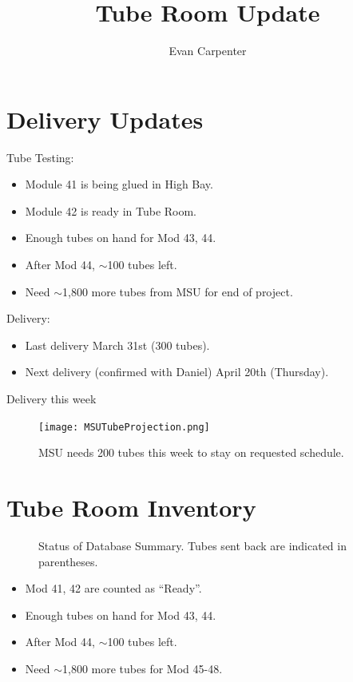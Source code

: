 \documentclass{beamer}
\title{Tube Room Update}
\author{Evan Carpenter}
\begin{document}
\begin{frame}
	\titlepage
\end{frame}
\section{Delivery Updates}
	\begin{frame}
		\begin{block}{Tube Testing:}
			\begin{itemize}
				\item Module 41 is being glued in High Bay.
				\item Module 42 is ready in Tube Room.
				\item Enough tubes on hand for Mod 43, 44.
				\item After Mod 44, $\sim$100 tubes left. 
				\item Need $\sim$1,800 more tubes from MSU for end of project.
			\end{itemize}
		\end{block}
		\begin{block}{Delivery:}
			\begin{itemize}
				\item Last delivery March 31st (300 tubes). 
				\item Next delivery (confirmed with Daniel) April 20th (Thursday).
			\end{itemize}
		\end{block}
	\end{frame}
\begin{frame}{Delivery this week}
	\begin{figure}[H]
		\texttt{[image: MSUTubeProjection.png]}
		\caption{MSU needs 200 tubes this week to stay on requested schedule.}
	\end{figure}
	
\end{frame}
\section{Tube Room Inventory}	
		
		\begin{frame}
			\begin{figure}
				\centering
				\caption*{Status of Database Summary. Tubes sent back are indicated in parentheses.}
				\scalebox{0.6}{}
			\end{figure}
			\begin{itemize}
				\item Mod 41, 42 are counted as ``Ready''.
				\item Enough tubes on hand for Mod 43, 44.
				\item After Mod 44, $\sim$100 tubes left.
				\item Need $\sim$1,800 more tubes for Mod 45-48.
			\end{itemize}
				

		\end{frame}
\end{document}
